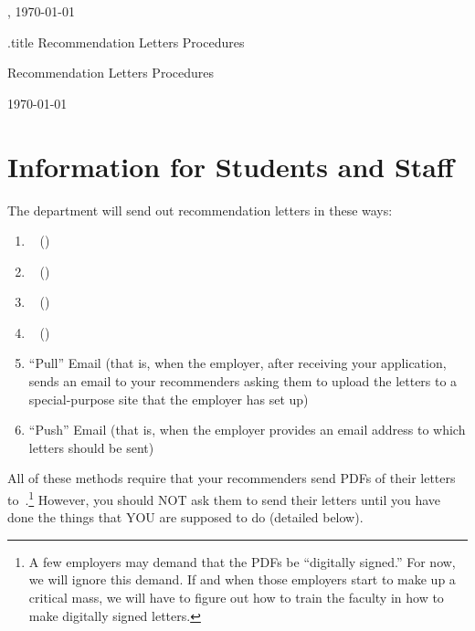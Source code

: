 \documentclass{econtex}
\begin{document}
\renewcommand{\thepage}{} %

\hfill{\tiny \jobname, \today}
\vspace{.1in}

\begin{verbatimwrite}{\jobname.title}
Recommendation Letters Procedures
\end{verbatimwrite}
\centerline{\Large Recommendation Letters Procedures}\medskip\medskip

\centerline{\today}\medskip\medskip

\ifdvi\large\fi

\section{Information for Students and Staff}

The department will send out recommendation letters in these ways:
\begin{enumerate}
\item \EJM ~ (\EJMLink)
\item \AJO ~ (\AJOLink)
\item \AEA ~ (\AEALink)
\item \Interfolio ~ (\InterfolioLink)
\item ``Pull'' Email (that is, when the employer, after receiving your application, sends an email to your recommenders asking them to upload the letters to a special-purpose site that the employer has set up)
\item ``Push'' Email (that is, when the employer provides an email address to which letters should be sent)
\end{enumerate}

All of these methods require that your recommenders send PDFs of their letters 
to~\JMStaffEmail.\footnote{A few employers may demand that the PDFs be ``digitally signed.''  For now, we will ignore this demand.  If and when those employers start to make up a critical mass, we will have to figure out how to train the faculty in how to make digitally signed letters.}  However, you should NOT ask them to send their letters until you have done the things that YOU are supposed to do (detailed below).
\end{document}
